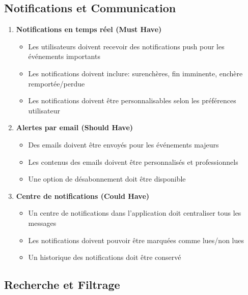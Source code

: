 \subsection{Notifications et Communication}

\begin{enumerate}
    \item \textbf{Notifications en temps réel (Must Have)}
    \begin{itemize}
        \item Les utilisateurs doivent recevoir des notifications push pour les événements importants
        \item Les notifications doivent inclure: surenchères, fin imminente, enchère remportée/perdue
        \item Les notifications doivent être personnalisables selon les préférences utilisateur
    \end{itemize}
    
    \item \textbf{Alertes par email (Should Have)}
    \begin{itemize}
        \item Des emails doivent être envoyés pour les événements majeurs
        \item Les contenus des emails doivent être personnalisés et professionnels
        \item Une option de désabonnement doit être disponible
    \end{itemize}
    
    \item \textbf{Centre de notifications (Could Have)}
    \begin{itemize}
        \item Un centre de notifications dans l'application doit centraliser tous les messages
        \item Les notifications doivent pouvoir être marquées comme lues/non lues
        \item Un historique des notifications doit être conservé
    \end{itemize}
\end{enumerate}

\subsection{Recherche et Filtrage}

